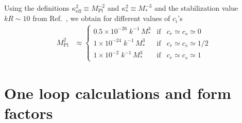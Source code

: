 \documentclass[twocolumn,showpacs,showkeys,prd,superscriptaddress]{revtex4-1}
\begin{document}

Using the definitions $\kappa_{\text{eff}}^2 \equiv M_{\text{Pl}}^{-2}$ and $\kappa_*^2 \equiv M_*^{-3}$ and the stabilization value $kR\sim10$ from Ref.~\cite{Goldberger:1999uk}, we obtain for different values of $c_i$'s
\begin{align}
  M_{\text{Pl}}^2 &\approx \left\{ \begin{matrix}
    0.5\times10^{-26}\;k^{-1}\,M_*^3 & \text{if} & c_r\simeq c_s\simeq 0 \\
    1\times10^{-24}\;k^{-1}\,M_*^3 & \text{if} & c_r\simeq c_s\simeq 1/2 \\
    1\times10^{-2}\;k^{-1}\,M_*^3 & \text{if} & c_r\simeq c_s\simeq 1 
  \end{matrix} \right.
\end{align}





%

\section{\label{sec:oneloop}One loop calculations and form factors}
\end{document}
